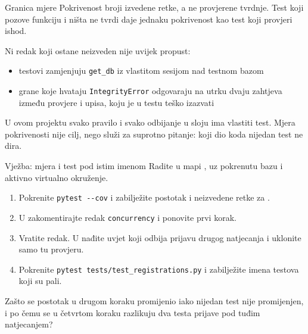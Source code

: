 \begin{frame}{Granica mjere}
Pokrivenost broji izvedene retke, a ne provjerene tvrdnje. Test koji pozove funkciju i ništa ne tvrdi daje jednaku pokrivenost kao test koji provjeri ishod.

\vspace{0.7em}
Ni redak koji ostane neizveden nije uvijek propust:

\vspace{0.3em}
\begin{itemize}
  \itemsep0.4em
  \item testovi zamjenjuju \texttt{get\_db} iz  vlastitom sesijom nad testnom bazom
  \item grane koje hvataju \texttt{IntegrityError} odgovaraju na utrku dvaju zahtjeva između provjere i upisa, koju je u testu teško izazvati
\end{itemize}

\vspace{0.6em}
\begin{konvencija}
U ovom projektu svako pravilo i svako odbijanje u sloju  ima vlastiti test. Mjera pokrivenosti nije cilj, nego služi za suprotno pitanje: koji dio koda nijedan test ne dira.
\end{konvencija}
\end{frame}

\begin{frame}{Vježba: mjera i test pod istim imenom}
Radite u mapi , uz pokrenutu bazu i aktivno virtualno okruženje.

\vspace{0.8em}
\begin{enumerate}
  \itemsep0.4em
  \item Pokrenite \texttt{pytest -{}-cov} i zabilježite postotak i neizvedene retke za .
  \item U  zakomentirajte redak \texttt{concurrency} i ponovite prvi korak.
  \item Vratite redak. U  nađite uvjet koji odbija prijavu drugog natjecanja i uklonite samo tu provjeru.
  \item Pokrenite \texttt{pytest tests/test\_registrations.py} i zabilježite imena testova koji su pali.
\end{enumerate}

\vspace{0.8em}
Zašto se postotak u drugom koraku promijenio iako nijedan test nije promijenjen, i po čemu se u četvrtom koraku razlikuju dva testa prijave pod tuđim natjecanjem?
\end{frame}

